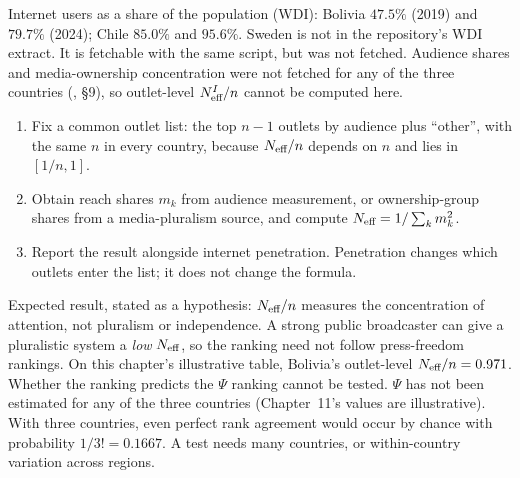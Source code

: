 \documentclass[../solutions_manual.tex]{subfiles}
\begin{document}

 Internet users as a share of the population (WDI): Bolivia $47.5\%$ (2019) and $79.7\%$ (2024); Chile $85.0\%$ and $95.6\%$. Sweden is not in the repository's WDI extract. It is fetchable with the same script, but was not fetched. Audience shares and media-ownership concentration were not fetched for any of the three countries (, \S9), so outlet-level $N_{\text{eff}}^I/n$ cannot be computed here.

\begin{enumerate}
\item Fix a common outlet list: the top $n-1$ outlets by audience plus ``other'', with the same $n$ in every country, because $N_{\text{eff}}/n$ depends on $n$ and lies in $[1/n, 1]$.
\item Obtain reach shares $m_k$ from audience measurement, or ownership-group shares from a media-pluralism source, and compute $N_{\text{eff}} = 1/\sum_k m_k^2$.
\item Report the result alongside internet penetration. Penetration changes which outlets enter the list; it does not change the formula.
\end{enumerate}

 Expected result, stated as a hypothesis: $N_{\text{eff}}/n$ measures the concentration of attention, not pluralism or independence. A strong public broadcaster can give a pluralistic system a \emph{low} $N_{\text{eff}}$, so the ranking need not follow press-freedom rankings. On this chapter's illustrative table, Bolivia's outlet-level $N_{\text{eff}}/n = 0.971$. Whether the ranking predicts the $\Psi$ ranking cannot be tested. $\Psi$ has not been estimated for any of the three countries (Chapter~11's values are illustrative). With three countries, even perfect rank agreement would occur by chance with probability $1/3! = 0.1667$. A test needs many countries, or within-country variation across regions.
\end{document}
